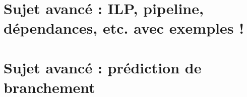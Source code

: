 





\section{Sujet avancé : ILP, pipeline, dépendances, etc. avec exemples !}

\section{Sujet avancé : prédiction de branchement}






